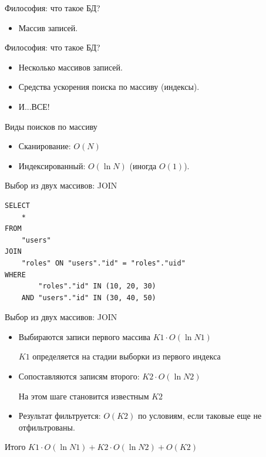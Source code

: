 \documentclass[aspectratio=169]{beamer}
\begin{document}
\begin{frame}{Философия: что такое БД?}
    \begin{itemize}
        \pause\item Массив записей.
    \end{itemize}
\end{frame}

\begin{frame}{Философия: что такое БД?}
    \begin{itemize}
        \item Несколько массивов записей.
        \pause\item Средства ускорения поиска по массиву (индексы).
        \pause\item И...\pause ВСЕ!
    \end{itemize}
\end{frame}

\begin{frame}{Виды поисков по массиву}
    \begin{itemize}
        \item Сканирование: $O(N)$
        \item Индексированный: $O(\ln N)$ (иногда $O(1)$).
    \end{itemize}
\end{frame}

\begin{frame}[fragile]{Выбор из двух массивов: JOIN}
\begin{verbatim}
SELECT
    *
FROM
    "users"
JOIN
    "roles" ON "users"."id" = "roles"."uid"
WHERE
        "roles"."id" IN (10, 20, 30)
    AND "users"."id" IN (30, 40, 50)
\end{verbatim}
\end{frame}

\begin{frame}{Выбор из двух массивов: JOIN}
    \begin{itemize}
        \item Выбираются записи первого массива $K1 \cdot O(\ln{N1})$
            \par {\small $K1$ определяется на стадии
                выборки из первого индекса}
        \item Сопоставляются записям второго: $K2 \cdot O(\ln{N2})$
            \par {\small На этом шаге становится известным $K2$}
        \item Результат фильтруется: $O(K2)$ по условиям,
          если таковые еще не отфильтрованы.
    \end{itemize}

    \begin{block}{Итого}
        $K1 \cdot O(\ln{N1}) + K2 \cdot O(\ln{N2}) + O(K2)$
    \end{block}
\end{frame}
\end{document}
